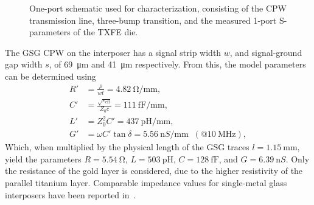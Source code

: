 \documentclass[conference]{IEEEtran}
\begin{document}
\begin{figure}[htbp]
    \centering
        \caption{One-port schematic used for characterization, consisting of the CPW transmission line, three-bump transition, and the measured 1-port S-parameters of the TXFE die. }
    \label{fig:lumped_element_model}
\end{figure}
%
The GSG CPW on the interposer has a signal strip width $w$, and signal-ground gap width $s$, of \SI{69}{\micro\meter} and \SI{41}{\micro\meter} respectively. From this, the model parameters can be determined using~\cite{Simons2004}
%
\begin{align}
    R'&=\frac{\rho}{wt}= \SI{4.82}{\ohm / \milli\meter},\\
    C'&=\frac{\sqrt{\varepsilon_{\text{eff}}}}{Z_{0}c}= \SI{111}{\femto\farad / \milli\meter},\\
    L'&=Z_{0}^{2}C' = \SI{437}{\pico\henry / \milli\meter},\\
    G'&=\omega C'\tan\delta= \SI{5.56}{ \nano S/\milli\meter} \;\;(@\SI{10}{\mega\hertz}),
\end{align}
%
Which, when multiplied by the physical length of the GSG traces $l=\SI{1.15}{\milli\metre}$, yield the parameters $R=\SI{5.54}{\ohm}$, $L=\SI{503}{\pico\henry}$, $C=\SI{128}{\femto\farad}$, and $G = \SI{6.39}{\nano S}$. Only the resistance of the gold layer is considered, due to the higher resistivity of the parallel titanium layer. Comparable impedance values for single-metal glass interposers have been reported in~\cite{Wang2016}.
\end{document}
